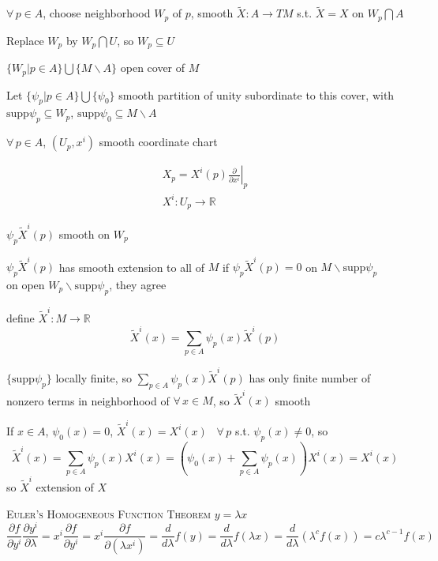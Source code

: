 
$\forall \, p \in A$, choose neighborhood $W_p$ of $p$, smooth $\widetilde{X}:A \to TM$ s.t. $\widetilde{X} = X$ on $W_p \bigcap A$

Replace $W_p$ by $W_p \bigcap U$, so $W_p \subseteq U$

$\lbrace W_p | p \in A \rbrace \bigcup \lbrace M \backslash A \rbrace$ open cover of $M$

Let $\lbrace \psi_p | p \in A \rbrace \bigcup \lbrace \psi_0 \rbrace$ smooth partition of unity subordinate to this cover, with $\text{supp}{\psi_p} \subseteq W_p$, $\text{supp}{\psi_0} \subseteq M \backslash A$

$\forall \, p \in A$, $(U_p,x^i)$ smooth coordinate chart

\[
\begin{gathered}
  X_p = \left. X^i(p) \frac{ \partial }{ \partial x^i } \right|_p \\ 
  X^i: U_p \to \mathbb{R}
\end{gathered}
\]

$\psi_p \widetilde{X}^i(p)$ smooth on $W_p$

$\psi_p\widetilde{X}^i(p)$ has smooth extension to all of $M$ if $\psi_p \widetilde{X}^i(p) =0$ on $M\backslash \text{supp}{\psi_p}$ \\

on open $W_p \backslash \text{supp}{ \psi_p}$, they agree

define $\widetilde{X}^i:M \to \mathbb{R}$ 
\[
\widetilde{X}^i(x) = \sum_{p \in A} \psi_p(x) \widetilde{X}^i(p)
\]

$\lbrace \text{supp}{\psi_p} \rbrace$ locally finite, so $\sum_{p\in A} \psi_p(x) \widetilde{X}^i(p)$ has only finite number of nonzero terms in neighborhood of $\forall \, x \in M$, so $\widetilde{X}^i(x)$ smooth

If $x\in A$, $\psi_0(x) = 0$, $\widetilde{X}^i(x) = X^i(x)$ \quad \, $\forall \, p $ s.t. $\psi_p(x) \neq 0$, so 
\[
\widetilde{X}^i(x) = \sum_{p\in A} \psi_p(x) X^i(x) = (\psi_0(x) + \sum_{p\in A} \psi_p(x)) X^i(x) = X^i(x)
\]
so $\widetilde{X}^i$ extension of $X$


\hrulefill

 \textsc{Euler's Homogeneous Function Theorem} 
$y = \lambda x$
\[
\frac{ \partial f}{ \partial y^i } \frac{ \partial y^i}{ \partial \lambda} = x^i \frac{ \partial f}{ \partial y^i} = x^i \frac{ \partial f}{ \partial ( \lambda x^i)} = \frac{d}{d\lambda} f(y) = \frac{d}{d\lambda} f(\lambda x) = \frac{d}{d\lambda} ( \lambda^c f(x)) = c \lambda^{c-1} f(x)
\]

